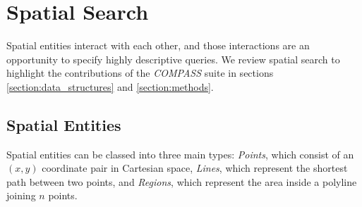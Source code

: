 \section{Spatial Search}
\label{section:background}
Spatial entities interact with each other, and those interactions are an opportunity to specify highly descriptive queries.
We review spatial search to highlight the contributions of the \emph{COMPASS} suite in sections \ref{section:data_structures} and \ref{section:methods}.
\subsection{Spatial Entities}
\par{
    Spatial entities can be classed into three main types: \textit{Points}, which consist of an $(x,y)$ coordinate pair in Cartesian space, \textit{Lines}, which represent the shortest path between two points, and \textit{Regions}, which represent the area inside a polyline joining $n$ points. %
    
    
}


